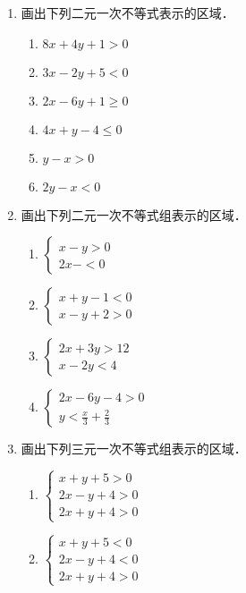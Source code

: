 \begin{ex}
\begin{enumerate}
    \item 画出下列二元一次不等式表示的区域．
\begin{multicols}{2}
\begin{enumerate}
    \item $8x+4y+1>0$
    \item $3x-2y+5<0$
    \item $2x-6y+1\ge 0$
    \item $4x+y-4\le 0$
    \item $y-x>0$
    \item $2y-x<0$
\end{enumerate}
\end{multicols}
\item 画出下列二元一次不等式组表示的区域．
\begin{multicols}{2}
\begin{enumerate}
\item $\begin{cases}
    x-y>0\\2x-<0
\end{cases}$
\item $\begin{cases}
    x+y-1<0\\x-y+2>0
\end{cases}$
\item $\begin{cases}
    2x+3y>12\\ x-2y<4
\end{cases}$
\item $\begin{cases}
    2x-6y-4>0\\ y<\frac{x}{3}+\frac{2}{3}
\end{cases}$
\end{enumerate}
\end{multicols}
    \item 画出下列三元一次不等式组表示的区域．
\begin{multicols}{2}
\begin{enumerate}    
    \item $\begin{cases}
        x+y+5>0\\2x-y+4>0\\2x+y+4>0
    \end{cases}$
    \item $\begin{cases}
        x+y+5<0\\2x-y+4<0\\2x+y+4>0
    \end{cases}$
\end{enumerate}
\end{multicols}
\end{enumerate}
\end{ex}

